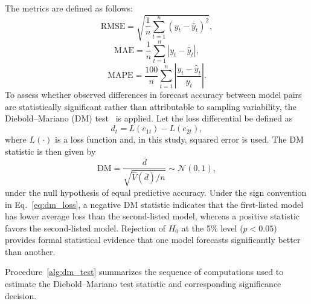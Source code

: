 \documentclass[pdflatex,sn-mathphys-num]{sn-jnl}%
\theoremstyle{thmstyleone}%
\theoremstyle{thmstyletwo}%
\theoremstyle{thmstylethree}%
\begin{document}
The metrics are defined as follows:
\begin{equation}
\mathrm{RMSE} = \sqrt{\frac{1}{n}\sum_{t=1}^{n}(y_t - \hat{y}_t)^2},
\label{eq:rmse}
\end{equation}
\begin{equation}
\mathrm{MAE} = \frac{1}{n}\sum_{t=1}^{n}\left|y_t - \hat{y}_t\right|,
\label{eq:mae}
\end{equation}
\begin{equation}
\mathrm{MAPE} = \frac{100}{n}\sum_{t=1}^{n}\left|\frac{y_t - \hat{y}_t}{y_t}\right|.
\label{eq:mape}
\end{equation}
To assess whether observed differences in forecast accuracy between model pairs are statistically significant rather than attributable to sampling variability, the Diebold--Mariano (DM) test~\cite{diebold1995} is applied. Let the loss differential be defined as
\begin{equation}
 d_t = L(e_{1t}) - L(e_{2t}),
\label{eq:dm_loss}
\end{equation}
where $L(\cdot)$ is a loss function and, in this study, squared error is used. The DM statistic is then given by
\begin{equation}
\mathrm{DM} = \frac{\bar{d}}{\sqrt{\hat{V}(\bar{d})/n}} \sim \mathcal{N}(0,1),
\label{eq:dm_stat}
\end{equation}
under the null hypothesis of equal predictive accuracy. Under the sign convention in Eq.~\ref{eq:dm_loss}, a negative DM statistic indicates that the first-listed model has lower average loss than the second-listed model, whereas a positive statistic favors the second-listed model. Rejection of $H_0$ at the 5\% level ($p < 0.05$) provides formal statistical evidence that one model forecasts significantly better than another.

Procedure~\ref{alg:dm_test} summarizes the sequence of computations used to estimate the Diebold--Mariano test statistic and corresponding significance decision.
\end{document}
